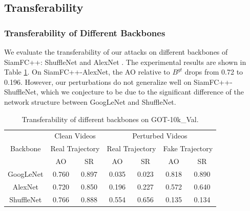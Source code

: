 \documentclass{article}
\begin{document}
\subsection{Transferability}

\subsubsection{Transferability of Different Backbones}

We evaluate the transferability of our attacks on different backbones of SiamFC++: ShuffleNet \cite{ShuffleNet} and AlexNet \cite{AlexNet}.
The experimental results are shown in Table \ref{tab:backbone}. On SiamFC++-AlexNet, the AO relative to $B^{gt}$ drops from 0.72 to 0.196. However, our perturbations do not generalize well on SiamFC++-ShuffleNet, which we conjecture to be due to the significant difference of the network structure between GoogLeNet and ShuffleNet.

\begin{table}[t]
\begin{center}
\scriptsize
\tabcolsep=2.0pt
\begin{tabular}{c|cc|cc|cc} 
\toprule
\multirow{3}{*}[-6pt]{Backbone} & \multicolumn{2}{c|}{Clean Videos}    & \multicolumn{4}{c}{Perturbed Videos}                                        \\ 
\cmidrule{2-7}
                          & \multicolumn{2}{c|}{Real Trajectory} & \multicolumn{2}{c|}{Real Trajectory} & \multicolumn{2}{c}{Fake Trajectory}  \\ 
\cmidrule{2-7}
                          & AO    & SR                           & AO    & SR                           & AO    & SR                           \\ 
\midrule
GoogLeNet                 & 0.760 & 0.897                        & 0.035 & 0.023                        & 0.818 & 0.890                        \\
AlexNet                   & 0.720 & 0.850                        & 0.196 & 0.227                        & 0.572 & 0.640                        \\
ShuffleNet                & 0.766 & 0.888                        & 0.554 & 0.656                        & 0.135 & 0.134                        \\
\bottomrule
\end{tabular}
\end{center}
\caption{Transferability of different backbones on GOT-10k\_Val.}
\label{tab:backbone}
\end{table}
\end{document}
